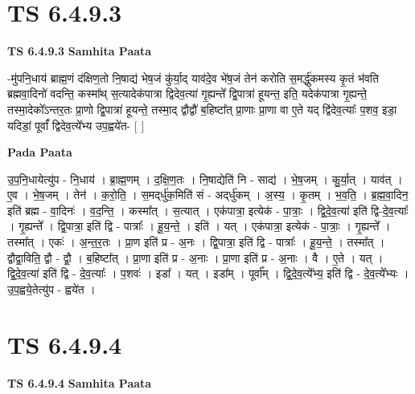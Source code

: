 \documentclass[17pt]{extarticle}
\begin{document}

\section{ TS 6.4.9.3 }

\textbf{TS 6.4.9.3 } \newline
\textbf{Samhita Paata} \newline

-मु॑पनि॒धाय॑ ब्राह्म॒णं द॑क्षिण॒तो नि॒षाद्य॑ भेष॒जं कु॑र्या॒द् याव॑दे॒व भे॑ष॒जं तेन॑ करोति स॒मर्द्धु॑कमस्य कृ॒तं भ॑वति ब्रह्मवा॒दिनो॑ वदन्ति॒  कस्मा᳚थ् स॒त्यादेक॑पात्रा द्विदेव॒त्या॑ गृ॒ह्यन्ते᳚ द्वि॒पात्रा॑ हूयन्त॒ इति॒ यदेक॑पात्रा गृ॒ह्यन्ते॒ तस्मा॒देको᳚ऽन्तर॒तः प्रा॒णो द्वि॒पात्रा॑ हूयन्ते॒ तस्मा॒द् द्वौद्वौ॑ ब॒हिष्टा᳚त् प्रा॒णाः प्रा॒णा वा ए॒ते यद् द्वि॑देव॒त्याः᳚ प॒शव॒ इडा॒ यदिडां॒ पूर्वां᳚ द्विदेव॒त्ये᳚भ्य उप॒ह्वये॑त- [  ] \newline

\textbf{Pada Paata} \newline

उ॒प॒नि॒धायेत्यु॑प - नि॒धाय॑ । ब्रा॒ह्म॒णम् । द॒क्षि॒ण॒तः । नि॒षाद्येति॑ नि - साद्य॑ । भे॒ष॒जम् । कु॒र्या॒त् । याव॑त् । ए॒व । भे॒ष॒जम् । तेन॑ । क॒रो॒ति॒ । स॒मद्‌र्धु॑क॒मिति॑ सं - अद्‌र्धु॑कम् । अ॒स्य॒ । कृ॒तम् । भ॒व॒ति॒ । ब्र॒ह्म॒वा॒दिन॒ इति॑ ब्रह्म - वा॒दिनः॑ । व॒द॒न्ति॒ । कस्मा᳚त् । स॒त्यात् । एक॑पात्रा॒ इत्येक॑ - पा॒त्राः॒ । द्वि॒दे॒व॒त्या॑ इति॑ द्वि-दे॒व॒त्याः᳚ । गृ॒ह्यन्ते᳚ । द्वि॒पात्रा॒ इति॑ द्वि - पात्राः᳚ । हू॒य॒न्ते॒ । इति॑ । यत् । एक॑पात्रा॒ इत्येक॑ - पा॒त्राः॒ । गृ॒ह्यन्ते᳚ । तस्मा᳚त् । एकः॑ । अ॒न्त॒र॒तः । प्रा॒ण इति॑ प्र - अ॒नः । द्वि॒पात्रा॒ इति॑ द्वि - पात्राः᳚ । हू॒य॒न्ते॒ । तस्मा᳚त् । द्वौद्वा॒विति॒ द्वौ - द्वौ॒ । ब॒हिष्टा᳚त् । प्रा॒णा इति॑ प्र - अ॒नाः । प्रा॒णा इति॑ प्र - अ॒नाः । वै । ए॒ते । यत् । द्वि॒दे॒व॒त्या॑ इति॑ द्वि - दे॒व॒त्याः᳚ । प॒शवः॑ । इडा᳚ । यत् । इडा᳚म् । पूर्वा᳚म् । द्वि॒दे॒व॒त्ये᳚भ्य॒ इति॑ द्वि - दे॒व॒त्ये᳚भ्यः । उ॒प॒ह्वये॒तेत्यु॑प - ह्वये॑त ।  \newline





\section{ TS 6.4.9.4 }

\textbf{TS 6.4.9.4 } \newline
\textbf{Samhita Paata} \newline
\end{document}
